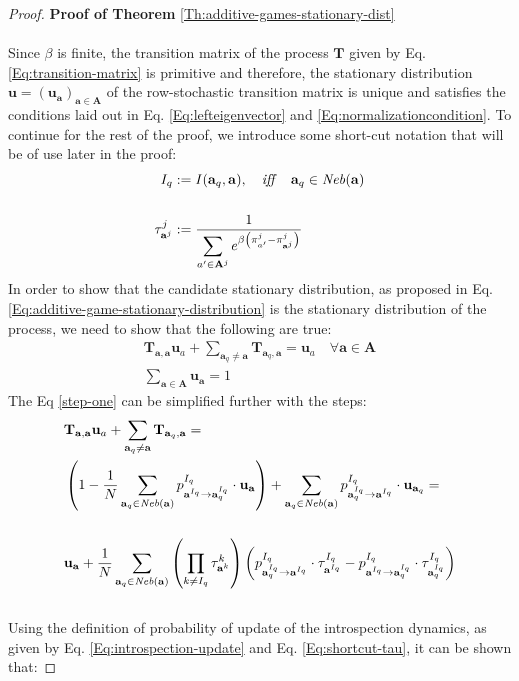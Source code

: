 \documentclass[11pt]{article}
\theoremstyle{plainCl1}
\theoremstyle{plainCl2}
\newcommand{\A}{\mathbf{A}}
\newcommand{\abf}{\mathbf{a}}
\newcommand{\T}{\mathbf{T}}
\newcommand{\ubf}{\mathbf{u}}
\begin{document}
\begin{proof}
\textbf{Proof of Theorem} \ref{Th:additive-games-stationary-dist} \\ \\ 
Since $\beta$ is finite, the transition matrix of the process $\T$ given by Eq. \ref{Eq:transition-matrix} is primitive and therefore, the stationary distribution $\ubf = (\ubf_\abf)_{\abf \in \A}$ of the row-stochastic transition matrix is unique and satisfies the conditions laid out in Eq. \ref{Eq:lefteigenvector} and \ref{Eq:normalizationcondition}. To continue for the rest of the proof, we introduce some short-cut notation that will be of use later in the proof:\\
\begin{align}
I_{q} &:= I(\abf_q,\abf), \quad \mathit{iff} \quad \abf_q \in \mathit{Neb}(\abf) \\ \notag \\ 
\label{Eq:shortcut-tau}
\tau^j_{\abf^j} &:= \frac{1}{\displaystyle \sum_{a' \in \A^j} e^{\beta \left( \pi^j_{a'} -  \pi^j_{\abf^j} \right) }} 
\end{align}
\noindent In order to show that the candidate stationary distribution, as proposed in Eq. \ref{Eq:additive-game-stationary-distribution} is the stationary distribution of the process, we need to show that the following are true:
\begin{eqnarray}
\label{step-one}
\T_{\abf,\abf} \ubf_a  + \sum_{\abf_q \neq \abf} \T_{\abf_q, \abf} = \ubf_a \quad \forall \abf \in \A \\ 
\label{step-two}
\sum_{\abf \in \A} \ubf_\abf  = 1
\end{eqnarray}
The Eq \ref{step-one} can be simplified further with the steps: 
\begin{align}
&\T_{\abf,\abf} \ubf_a  + \sum_{\abf_q \neq \abf} \T_{\abf_q, \abf} = \\
& \left( 1 - \frac{1}{N} \sum_{\abf_q \in \mathit{Neb}(\abf)} p^{I_q}_{\abf^{I_q} \to \abf^{I_q}_q} \cdot \ubf_{\abf} \right) + \sum_{\abf_q \in \mathit{Neb}(\abf)} p^{I_q}_{\abf^{I_q}_q \to \abf^{I_q}} \cdot \ubf_{\abf_q} = \\ \notag \\
\label{eq:important-step}
& \ubf_\abf +  \frac{1}{N} \sum_{\abf_q \in \mathit{Neb}(\abf)} \left( \prod_{k \neq I_q} \tau^k_{\abf^k} \right) \left( p^{I_q}_{\abf^{I_q}_q \to \abf^{I_q}} \cdot \tau^{I_q}_{\abf^{I_q}} -  p^{I_q}_{\abf^{I_q} \to \abf^{I_q}_q} \cdot \tau^{I_q}_{\abf^{I_q}_q} \right)
\end{align}
\\ Using the definition of probability of update of the introspection dynamics, as given by Eq. \ref{Eq:introspection-update} and Eq. \ref{Eq:shortcut-tau}, it can be shown that: 

\end{proof}
\end{document}
